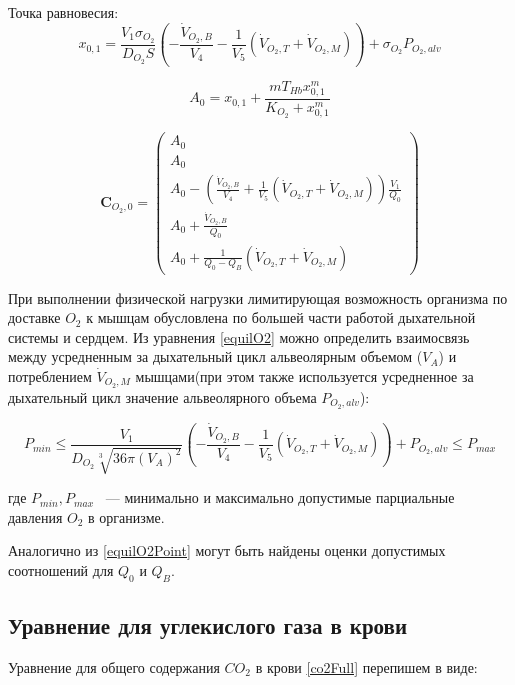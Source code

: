 Точка равновесия:
\begin{equation}
x_{0,1}= \frac{V_{1}\sigma_{O_{2}}}{D_{O_{2}}S}\left(\displaystyle -\frac{\dot{V}_{O_{2},B}}{V_{4}}
\displaystyle  -\frac{1}{V_{5}}\left(\dot{V}_{O_{2},T}+\dot{V}_{O_{2},M}\right)\right)+\sigma_{O_{2}}P_{O_{2},alv} 
\label{equilO2}
\end{equation}

\begin{equation}
A_{0}=x_{0,1}+\frac{mT_{Hb}x_{0,1}^{m}}{K_{O_{2}}+x_{0,1}^{m}}
\end{equation}

\begin{equation}
\displaystyle \mathbf{C}_{O_{2},0}
=\begin{pmatrix}
A_{0} \\
A_{0} \\
A_{0} - \left(\displaystyle \frac{\dot{V}_{O_{2},B}}{V_{4}}
\displaystyle  +\frac{1}{V_{5}}\left(\dot{V}_{O_{2},T}+\dot{V}_{O_{2},M}\right)\right)\frac{V_{1}}{Q_{0}}\\
A_{0}+\frac{\dot{V}_{O_{2},B}}{Q_{0}} \\
A_{0}+\frac{1}{Q_{0}-Q_{B}}\left(\dot{V}_{O_{2},T}+\dot{V}_{O_{2},M}\right)
\end{pmatrix}
\label{equilO2Point}
\end{equation}

При выполнении физической нагрузки лимитирующая возможность организма по доставке \(O_{2}\) к мышцам обусловлена по большей части работой дыхательной системы и сердцем. Из уравнения \eqref{equilO2} можно определить взаимосвязь между усредненным за дыхательный цикл альвеолярным объемом (\(V_{A}\)) и потреблением \(\dot{V}_{O_{2},M}\) мышцами(при этом также используется усредненное за дыхательный цикл значение альвеолярного объема \(P_{O_{2},alv}\)):

\begin{equation}
P_{min} \le  \frac{V_{1}}{D_{O_{2}}\sqrt[{3}]{36\pi \left(V_{A} \right)^{2} }}\left(-\frac{\dot{V}_{O_{2},B}}{V_{4}}
-\frac{1}{V_{5}}\left(\dot{V}_{O_{2},T}+\dot{V}_{O_{2},M}\right)\right)+P_{O_{2},alv} \le P_{max}
\end{equation}

где \(P_{min}, P_{max}\) ~--- минимально и максимально допустимые парциальные давления \(O_{2}\) в организме.

Аналогично из \eqref{equilO2Point} могут быть найдены оценки допустимых соотношений для \(Q_{0}\) и \(Q_{B}\).

\subsection{Уравнение для углекислого газа в крови}
Уравнение для общего содержания \(CO_{2}\) в крови \eqref{co2Full} перепишем в виде:

